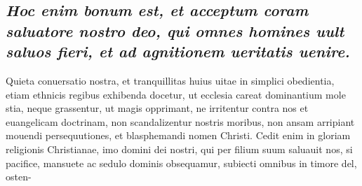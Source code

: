 \documentclass{article}
\begin{document}
\begin{pages}
{}
\subsection*{\textit{Hoc enim bonum est, et acceptum coram saluatore nostro deo, qui omnes homines uult saluos fieri, et ad agnitionem ueritatis uenire. }}\pstart Quieta conuersatio nostra, et tranquillitas huius uitae in simplici obedientia, etiam ethnicis regibus exhibenda docetur, ut ecclesia careat dominantium mole stia, neque  grassentur, ut magis opprimant, ne irritentur contra nos et euangelicam doctrinam, non scandalizentur nostris moribus, non ansam arripiant mouendi persequutiones, et blasphemandi nomen Christi. Cedit enim in gloriam religionis Christianae, imo domini dei nostri, qui per filium suum saluauit nos, si pacifice, mansuete ac sedulo dominis obsequamur, subiecti omnibus in timore del, osten-  \pend

\end{pages}
\end{document}
